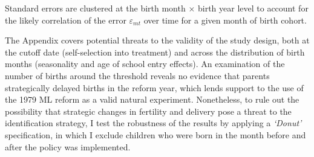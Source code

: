 
Standard errors are clustered at the birth month $\times$ birth year level to account for the likely correlation of the error $\varepsilon_{mt}$ over time for a given month of birth cohort.



The Appendix covers potential threats to the validity of the study design, both at the cutoff date (self-selection into treatment) and across the distribution of birth months (seasonality and age of school entry effects). An examination of the number of births around the threshold reveals no evidence that parents strategically delayed births in the reform year, which lends support to the use of the 1979 ML reform as a valid natural experiment. Nonetheless, to rule out the possibility that strategic changes in fertility and delivery pose a threat to the identification strategy, I test the robustness of the results by applying a \textit{`Donut'} specification, in which I exclude children who were born in the month before and after the policy was implemented.
 


	











